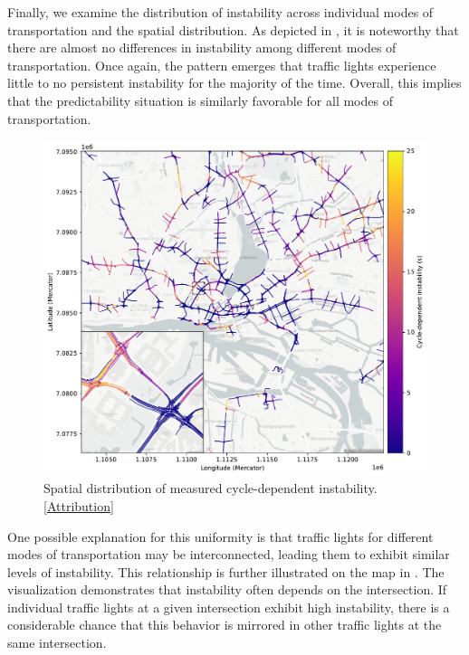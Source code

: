 Finally, we examine the distribution of instability across individual modes of transportation and the spatial distribution. As depicted in , it is noteworthy that there are almost no differences in instability among different modes of transportation. Once again, the pattern emerges that traffic lights experience little to no persistent instability for the majority of the time. Overall, this implies that the predictability situation is similarly favorable for all modes of transportation.

\begin{figure}[ht]
    \centering
    \includegraphics[width=\linewidth]{images/predictability-map.pdf}
    \caption{Spatial distribution of measured cycle-dependent instability. [\hyperref[attribution]{Attribution}]}\label{fig:predictability-map}
\end{figure}

One possible explanation for this uniformity is that traffic lights for different modes of transportation may be interconnected, leading them to exhibit similar levels of instability. This relationship is further illustrated on the map in . The visualization demonstrates that instability often depends on the intersection. If individual traffic lights at a given intersection exhibit high instability, there is a considerable chance that this behavior is mirrored in other traffic lights at the same intersection.

